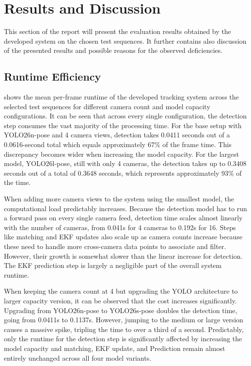 \section{Results and Discussion} \label{results}

This section of the report will present the evaluation results obtained by the developed system on the chosen test sequences. It further contains also discussion of the presented results and possible reasons for the observed deficiencies.

\subsection{Runtime Efficiency} \label{effic}

 shows the mean per-frame runtime of the developed tracking system across the selected test sequences for different camera count and model capacity configurations. It can be seen that across every single configuration, the detection step consumes the vast majority of the processing time. For the base setup with YOLO26n-pose and 4 camera views, detection takes 0.0411 seconds out of a 0.0616-second total which equals approximately 67\% of the frame time. This discrepancy becomes wider when increasing the model capacity. For the largest model, YOLO26l-pose, still with only 4 cameras, the detection takes up to 0.3408 seconds out of a total of 0.3648 seconds, which represents approximately 93\% of the time.

When adding more camera views to the system using the smallest model, the computational load predictably increases. Because the detection model has to run a forward pass on every single camera feed, detection time scales almost linearly with the number of cameras, from 0.041s for 4 cameras to 0.192s for 16. Steps like matching and EKF updates also scale up as camera counts increase because these need to handle more cross-camera data points to associate and filter. However, their growth is somewhat slower than the linear increase for detection. The EKF prediction step is largely a negligible part of the overall system runtime.

When keeping the camera count at 4 but upgrading the YOLO architecture to larger capacity version, it can be observed that the cost increases significantly. Upgrading from YOLO26n-pose to YOLO26s-pose doubles the detection time, going from 0.0411s to 0.1137s. However, jumping to the medium or large version causes a massive spike, tripling the time to over a third of a second. Predictably, only the runtime for the detection step is significantly affected by increasing the model capacity and matching, EKF update, and Prediction remain almost entirely unchanged across all four model variants.

